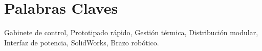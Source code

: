 \chapter{Palabras Claves}
\lineaLateral


\noindent Gabinete de control, Prototipado rápido, Gestión térmica, Distribución modular, Interfaz de potencia, SolidWorks, Brazo robótico.